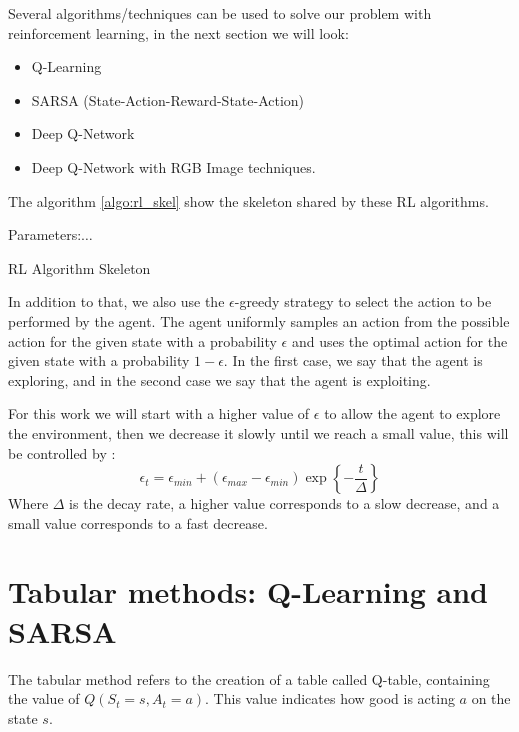 Several algorithms/techniques can be used  to solve our problem with reinforcement learning, in the next section we will look:
\begin{itemize}
	\item Q-Learning
	\item SARSA (State-Action-Reward-State-Action)
	\item Deep Q-Network
	\item Deep Q-Network with RGB Image techniques.
\end{itemize}
The algorithm \ref{algo:rl_skel} show the skeleton shared by these RL algorithms.
\begin{algorithm}
	Parameters:$\ldots$\\
	\caption{RL Algorithm Skeleton}
	\label{algo:rl_skel}
\end{algorithm}
In addition to that, we also use the $\epsilon$-greedy strategy to select the action to be performed by the agent. The agent uniformly samples an action from the possible action for the given state with a probability $\epsilon$ and uses the optimal action for the given state with a probability $1-\epsilon$. In the first case, we say that the agent is exploring, and in the second case we say that the agent is exploiting.


For this work we will start with a higher value of $\epsilon$ to allow the agent to explore the environment, then we decrease it slowly until we reach a small value, this will be controlled by :
\begin{equation}
	\epsilon_t = \epsilon_{min} + \left(\epsilon_{max} - \epsilon_{min}\right) \exp\left\{-\frac{t}{\Delta}\right\}
\end{equation}
Where $\Delta$ is the decay rate, a higher value corresponds to a slow decrease, and a small value corresponds to a fast decrease.
\section{Tabular methods: Q-Learning and SARSA}
The tabular method refers to the creation of a table called Q-table, containing the value of $Q(S_t=s, A_t=a)$. This value indicates how good is acting $a$ on the state $s$.

